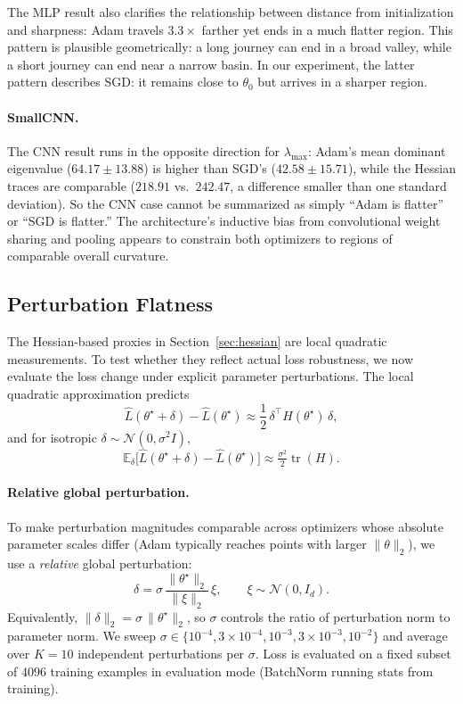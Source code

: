 \documentclass[11pt]{article}
\begin{document}
The MLP result also clarifies the relationship between distance from initialization and sharpness: Adam travels $3.3\times$ farther yet ends in a much flatter region.
This pattern is plausible geometrically: a long journey can end in a broad valley, while a short journey can end near a narrow basin.
In our experiment, the latter pattern describes SGD: it remains close to $\theta_0$ but arrives in a sharper region.

\paragraph{SmallCNN.}
The CNN result runs in the opposite direction for $\lambda_{\max}$: Adam's mean dominant eigenvalue ($64.17 \pm 13.88$) is higher than SGD's ($42.58 \pm 15.71$), while the Hessian traces are comparable ($218.91$ vs.\ $242.47$, a difference smaller than one standard deviation).
So the CNN case cannot be summarized as simply ``Adam is flatter'' or ``SGD is flatter.''
The architecture's inductive bias from convolutional weight sharing and pooling appears to constrain both optimizers to regions of comparable overall curvature.

\subsection{Perturbation Flatness}
\label{sec:perturbation}

The Hessian-based proxies in Section~\ref{sec:hessian} are local quadratic measurements. To test whether they reflect actual loss robustness, we now evaluate the loss change under explicit parameter perturbations. The local quadratic approximation predicts
\[
\widehat L(\theta^\star+\delta) - \widehat L(\theta^\star)
\approx \frac{1}{2}\,\delta^\top H(\theta^\star)\,\delta,
\]
and for isotropic $\delta\sim\mathcal{N}(0,\sigma^2 I)$,
\[
\mathbb{E}_{\delta}\big[\widehat L(\theta^\star+\delta)-\widehat L(\theta^\star)\big]
\approx \tfrac{\sigma^2}{2}\operatorname{tr}(H).
\]

\paragraph{Relative global perturbation.}
To make perturbation magnitudes comparable across optimizers whose absolute parameter scales differ (Adam typically reaches points with larger $\|\theta\|_2$), we use a \emph{relative} global perturbation:
\[
\delta = \sigma\,\frac{\|\theta^\star\|_2}{\|\xi\|_2}\,\xi,
\qquad \xi\sim\mathcal{N}(0,I_d).
\]
Equivalently, $\|\delta\|_2 = \sigma\,\|\theta^\star\|_2$, so $\sigma$ controls the ratio of perturbation norm to parameter norm. We sweep $\sigma\in\{10^{-4},3\times 10^{-4},10^{-3},3\times 10^{-3},10^{-2}\}$ and average over $K=10$ independent perturbations per $\sigma$. Loss is evaluated on a fixed subset of $4096$ training examples in evaluation mode (BatchNorm running stats from training).
\end{document}
